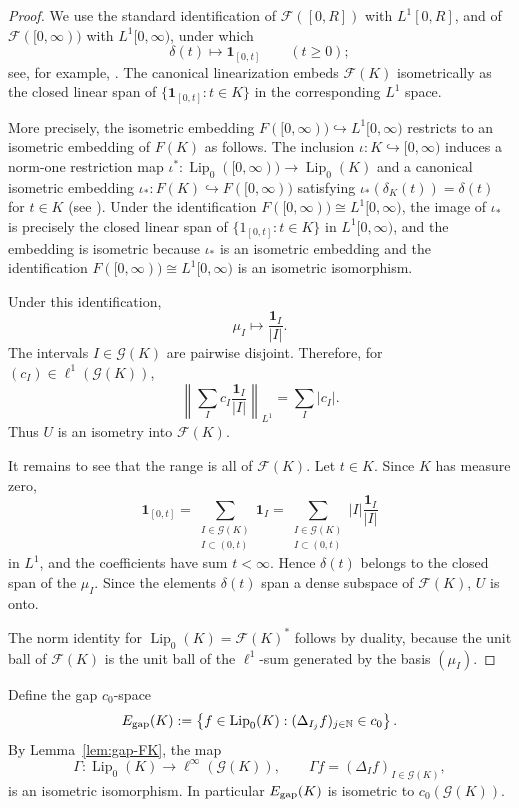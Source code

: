 \documentclass[11pt]{amsart}
\theoremstyle{plain}
\theoremstyle{definition}
\theoremstyle{remark}
\newcommand{\Lip}{\operatorname{Lip}}
\newcommand{\F}{\mathcal F}
\newcommand{\N}{\mathbb N}
\begin{document}
\begin{proof}
We use the standard identification of $\F([0,R])$ with $L^1[0,R]$, and of
$\F([0,\infty))$ with $L^1[0,\infty)$, under which
\[
        \delta(t)\longmapsto \mathbf 1_{[0,t]}
        \qquad(t\ge0);
\]
see, for example, \cite{Wea18}. The canonical linearization embeds
$\F(K)$ isometrically as the closed linear span of
$\{\mathbf 1_{[0,t]}:t\in K\}$ in the corresponding $L^1$ space.



More precisely, the isometric embedding $F([0,\infty))\hookrightarrow L^1[0,\infty)$
restricts to an isometric embedding of $F(K)$ as follows.
The inclusion $\iota\colon K\hookrightarrow [0,\infty)$ induces a
norm-one restriction map $\iota^*\colon \Lip_0([0,\infty))\to\Lip_0(K)$
and a canonical isometric embedding
$\iota_*\colon F(K)\hookrightarrow F([0,\infty))$
satisfying $\iota_*(\delta_K(t))=\delta(t)$ for $t\in K$
(see \cite[Proposition~2.2.2]{Wea18}).
Under the identification $F([0,\infty))\cong L^1[0,\infty)$,
the image of $\iota_*$ is precisely the closed linear span of
$\{1_{[0,t]}:t\in K\}$ in $L^1[0,\infty)$, and the embedding is isometric
because $\iota_*$ is an isometric embedding and the identification
$F([0,\infty))\cong L^1[0,\infty)$ is an isometric isomorphism.

Under this identification,
\[
        \mu_I\longmapsto \frac{\mathbf 1_I}{|I|}.
\]
The intervals $I\in\mathcal G(K)$ are pairwise disjoint. Therefore, for
$(c_I)\in\ell^1(\mathcal G(K))$,
\[
        \left\|\sum_I c_I\frac{\mathbf 1_I}{|I|}\right\|_{L^1}
        =\sum_I |c_I|.
\]
Thus $U$ is an isometry into $\F(K)$.

It remains to see that the range is all of $\F(K)$. Let $t\in K$. Since
$K$ has measure zero,
\[
        \mathbf 1_{[0,t]}
        =\sum_{\substack{I\in\mathcal G(K)\\ I\subset (0,t)}}
        \mathbf 1_I
        =\sum_{\substack{I\in\mathcal G(K)\\ I\subset (0,t)}}
        |I|\frac{\mathbf 1_I}{|I|}
\]
in $L^1$, and the coefficients have sum $t<\infty$. Hence
$\delta(t)$ belongs to the closed span of the $\mu_I$. Since the elements
$\delta(t)$ span a dense subspace of $\F(K)$, $U$ is onto.

The norm identity for $\Lip_0(K)=\F(K)^*$ follows by duality, because the
unit ball of $\F(K)$ is the unit ball of the $\ell^1$-sum generated by the
basis $(\mu_I)$.
\end{proof}

Define the gap $c_0$-space
\[
        E_{\rm gap}(K):=
        \left\{f\in\Lip_0(K):
        (\Delta_{I_j}f)_{j\in\N}\in c_0\right\}.
\]
By Lemma~\ref{lem:gap-FK}, the map
\[
        \Gamma:\Lip_0(K)\longrightarrow \ell^\infty(\mathcal G(K)),
        \qquad
        \Gamma f=(\Delta_I f)_{I\in\mathcal G(K)},
\]
is an isometric isomorphism. In particular $E_{\rm gap}(K)$ is isometric to
$c_0(\mathcal G(K))$.
\end{document}
